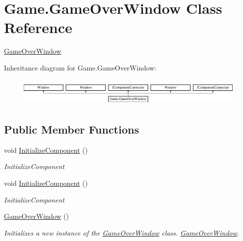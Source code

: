 \hypertarget{class_game_1_1_game_over_window}{}\section{Game.\+Game\+Over\+Window Class Reference}
\label{class_game_1_1_game_over_window}


\mbox{\hyperlink{class_game_1_1_game_over_window}{Game\+Over\+Window}}  


Inheritance diagram for Game.\+Game\+Over\+Window\+:\begin{figure}[H]
\begin{center}
\leavevmode
\includegraphics[height=1.391304cm]{class_game_1_1_game_over_window}
\end{center}
\end{figure}
\subsection*{Public Member Functions}
\begin{DoxyCompactItemize}
\item 
void \mbox{\hyperlink{class_game_1_1_game_over_window_ac79eae24ff9056e4070cab127e910d60}{Initialize\+Component}} ()
\begin{DoxyCompactList}\small\item\em Initialize\+Component \end{DoxyCompactList}\item 
void \mbox{\hyperlink{class_game_1_1_game_over_window_ac79eae24ff9056e4070cab127e910d60}{Initialize\+Component}} ()
\begin{DoxyCompactList}\small\item\em Initialize\+Component \end{DoxyCompactList}\item 
\mbox{\hyperlink{class_game_1_1_game_over_window_a0e8afb0d7fc7db6ab4e2f8d72f09664e}{Game\+Over\+Window}} ()
\begin{DoxyCompactList}\small\item\em Initializes a new instance of the \mbox{\hyperlink{class_game_1_1_game_over_window}{Game\+Over\+Window}} class. \mbox{\hyperlink{class_game_1_1_game_over_window}{Game\+Over\+Window}}. \end{DoxyCompactList}\end{DoxyCompactItemize}


